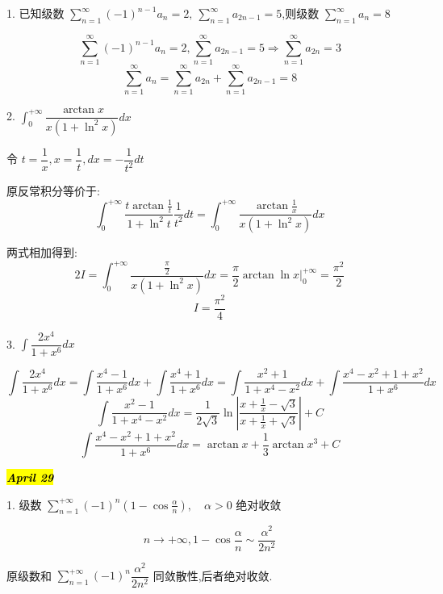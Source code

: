 1. 已知级数 $\sum\limits_{n=1}^{\infty}(-1)^{n-1}a_{n}=2,\ \sum\limits_{n=1}^{\infty}a_{2n-1}=5$,则级数 $\sum\limits_{n=1}^{\infty}a_{n}=8$

\begin{solution}
	
	$$\sum\limits_{n=1}^{\infty}(-1)^{n-1}a_{n}=2,\sum\limits_{n=1}^{\infty}a_{2n-1}=5\Rightarrow \sum\limits_{n=1}^{\infty}a_{2n}=3$$
	$$\sum\limits_{n=1}^{\infty}a_{n}=\sum\limits_{n=1}^{\infty}a_{2n}+\sum\limits_{n=1}^{\infty}a_{2n-1}=8$$
\end{solution}


2. $\int_{0}^{+\infty}\dfrac{\arctan x}{x(1+\ln^2 x)}dx$
\begin{solution}
	
	令 $t=\dfrac{1}{x},x=\dfrac{1}{t},dx=-\dfrac{1}{t^2}dt$
	
	原反常积分等价于: 
	$$\int_{0}^{+\infty}\frac{t\arctan \frac{1}{t}}{1+\ln^2 t}\frac{1}{t^2}dt=\int_{0}^{+\infty}\frac{\arctan \frac{1}{x}}{x(1+\ln^2 x)}dx$$
	
	两式相加得到: 
	$$2I=\int_{0}^{+\infty}\frac{\frac{\pi}{2}}{x(1+\ln^2 x)}dx=\frac{\pi}{2}\arctan \ln x|_{0}^{+\infty}=\frac{\pi^2}{2}$$
	$$I=\frac{\pi^2}{4}$$
\end{solution}


3. $\int\dfrac{2x^4}{1+x^6}dx$
\begin{solution}
	
	$$\int\frac{2x^4}{1+x^6}dx=\int\frac{x^4-1}{1+x^6}dx+\int\frac{x^4+1}{1+x^6}dx=\int\frac{x^2+1}{1+x^4-x^2}dx+\int\frac{x^4-x^2+1+x^2}{1+x^6}dx$$
	$$\int\frac{x^2-1}{1+x^4-x^2}dx=\frac{1}{2\sqrt{3}}\ln|\frac{x+\frac{1}{x}-\sqrt{3}}{x+\frac{1}{x}+\sqrt{3}}|+C$$
	$$\int\frac{x^4-x^2+1+x^2}{1+x^6}dx=\arctan x+\frac{1}{3}\arctan x^3+C$$
\end{solution}


\hl{\textbf{\textit{April 29}}}

1. 级数 $\sum\limits_{n=1}^{+\infty}(-1)^n(1-\cos \frac{\alpha}{n}),\quad \alpha >0$ 绝对收敛

\begin{solution}
	
	$$n\rightarrow +\infty,1-\cos \frac{\alpha}{n}\sim \frac{\alpha^2}{2n^2}$$
	
	原级数和 $\sum\limits_{n=1}^{+\infty}(-1)^n\dfrac{\alpha^2}{2n^2}$ 同敛散性,后者绝对收敛.
\end{solution}

